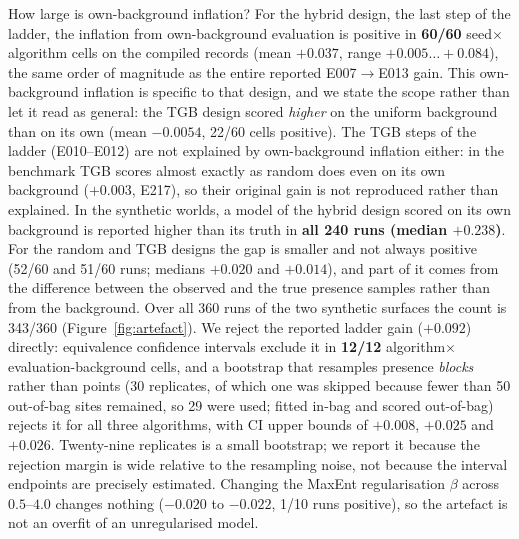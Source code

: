 \documentclass[12pt]{article}
\begin{document}
How large is own-background inflation?
For the hybrid design, the last step of the ladder, the inflation from own-background evaluation is positive in \textbf{60/60} seed$\times$algorithm cells on the compiled records (mean $+0.037$, range $+0.005 \ldots +0.084$), the same order of magnitude as the entire reported E007$\rightarrow$E013 gain.
This own-background inflation is specific to that design, and we state the scope rather than let it read as general: the TGB design scored \emph{higher} on the uniform background than on its own (mean $-0.0054$, 22/60 cells positive).
The TGB steps of the ladder (E010--E012) are not explained by own-background inflation either: in the benchmark TGB scores almost exactly as random does even on its own background ($+0.003$, E217), so their original gain is not reproduced rather than explained.
In the synthetic worlds, a model of the hybrid design scored on its own background is reported higher than its truth in \textbf{all 240 runs (median $+0.238$)}. For the random and TGB designs the gap is smaller and not always positive (52/60 and 51/60 runs; medians $+0.020$ and $+0.014$), and part of it comes from the difference between the observed and the true presence samples rather than from the background. Over all 360 runs of the two synthetic surfaces the count is 343/360 (Figure~\ref{fig:artefact}).
We reject the reported ladder gain ($+0.092$) directly: equivalence confidence intervals exclude it in \textbf{12/12} algorithm$\times$evaluation-background cells, and a bootstrap that resamples presence \emph{blocks} rather than points (30 replicates, of which one was skipped because fewer than 50 out-of-bag sites remained, so 29 were used; fitted in-bag and scored out-of-bag) rejects it for all three algorithms, with CI upper bounds of $+0.008$, $+0.025$ and $+0.026$. Twenty-nine replicates is a small bootstrap; we report it because the rejection margin is wide relative to the resampling noise, not because the interval endpoints are precisely estimated.
Changing the MaxEnt regularisation $\beta$ across $0.5$--$4.0$ changes nothing ($-0.020$ to $-0.022$, 1/10 runs positive), so the artefact is not an overfit of an unregularised model.
\end{document}
